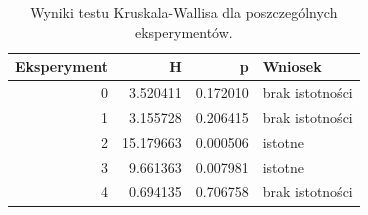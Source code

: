 \begin{table}
\caption{Wyniki testu Kruskala-Wallisa dla poszczególnych eksperymentów.}
\label{tab:kruskal_exp}
\begin{tabular}{rrrl}
\toprule
Eksperyment & H & p & Wniosek \\
\midrule
0 & 3.520411 & 0.172010 & brak istotności \\
1 & 3.155728 & 0.206415 & brak istotności \\
2 & 15.179663 & 0.000506 & istotne \\
3 & 9.661363 & 0.007981 & istotne \\
4 & 0.694135 & 0.706758 & brak istotności \\
\bottomrule
\end{tabular}
\end{table}
